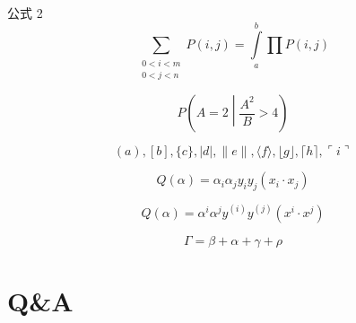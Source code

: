\begin{frame}{公式 2}
    $$\sum_{\substack{0<i<m \\ 0<j<n }} 
      P(i,j)=\int\limits_a^b\prod P(i,j)$$

    $$P\left(A=2\middle|\frac{A^2}{B}>4\right)$$

    $$( a ), [ b ], \{ c \}, | d |, \| e \|,
    \langle f \rangle, \lfloor g \rfloor,
    \lceil h \rceil, \ulcorner i \urcorner$$
\end{frame}

\begin{frame}
    $$Q(\alpha)=\alpha_i\alpha_jy_iy_j(x_i\cdot x_j)$$

    $$Q(\alpha)=\alpha^i\alpha^jy^{(i)}y^{(j)}(x^i\cdot x^j)$$
    
    $$\Gamma=\beta+\alpha+\gamma+\rho$$
\end{frame}



\section*{Q\&A}
\begin{frame}
    \centering
    \vspace{2.2cm}


    \vspace{0.4cm}{\Large\itshape \faSlideshare~希望老师批评指正！}
\end{frame}